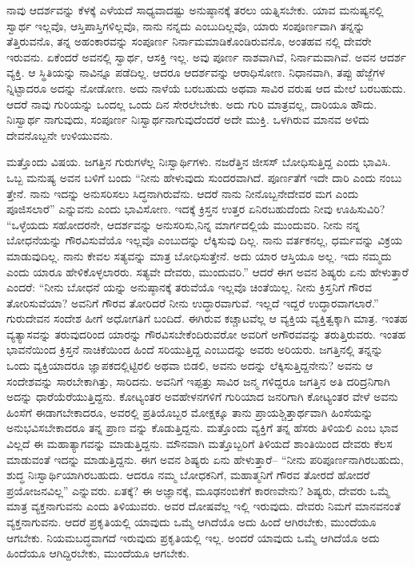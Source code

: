 ನಾವು ಆದರ್ಶವನ್ನು ಕೆಳಕ್ಕೆ ಎಳೆಯದೆ ಸಾಧ್ಯವಾದಷ್ಟು ಅನುಷ್ಠಾನಕ್ಕೆ ತರಲು ಯತ್ನಿಸಬೇಕು. ಯಾವ ಮನುಷ್ಯನಲ್ಲಿ ಸ್ವಾರ್ಥ ಇಲ್ಲವೊ, ಆಸ್ತಿಪಾಸ್ತಿಗಳಿಲ್ಲವೊ, ನಾನು ನನ್ನದು ಎಂಬುದಿಲ್ಲವೊ, ಯಾರು ಸಂಪೂರ್ಣವಾಗಿ ತನ್ನನ್ನು ತೆತ್ತಿರುವನೊ, ತನ್ನ ಅಹಂಕಾರವನ್ನು ಸಂಪೂರ್ಣ ನಿರ್ನಾಮಮಾಡಿಕೊಂಡಿರುವನೊ, ಅಂತಹವ ನಲ್ಲಿ ದೇವರೇ ಇರುವನು. ಏಕೆಂದರೆ ಅವನಲ್ಲಿ ಸ್ವಾರ್ಥ, ಆಸಕ್ತಿ ಇಲ್ಲ. ಅವು ಪೂರ್ಣ ನಾಶವಾಗಿವೆ, ನಿರ್ನಾಮ\-ವಾಗಿವೆ. ಅವನ ಆದರ್ಶ ವ್ಯಕ್ತಿ. ಆ ಸ್ಥಿತಿಯನ್ನು ನಾವಿನ್ನೂ ಪಡೆದಿಲ್ಲ. ಆದರೂ ಆದರ್ಶವನ್ನು ಆರಾಧಿಸೋಣ. ನಿಧಾನವಾಗಿ, ತಪ್ಪು ಹೆಜ್ಜೆಗಳ ನ್ನಿಟ್ಟಾದರೂ ಅದನ್ನು ನೋಡೋಣ. ಅದು ನಾಳೆಯೆ ಬರಬಹುದು ಅಥವಾ ಸಾವಿರ ವರುಷ ಆದ ಮೇಲೆ ಬರಬಹುದು. ಆದರೆ ನಾವು ಗುರಿಯನ್ನು ಒಂದಲ್ಲ ಒಂದು ದಿನ ಸೇರಲೇಬೇಕು. ಅದು ಗುರಿ ಮಾತ್ರವಲ್ಲ, ದಾರಿಯೂ ಹೌದು. ನಿಃಸ್ವಾರ್ಥ ನಾಗುವುದು, ಸಂಪೂರ್ಣ ನಿಃಸ್ವಾರ್ಥನಾಗುವುದೆಂದರೆ ಅದೇ ಮುಕ್ತಿ. ಒಳಗಿರುವ ಮಾನವ ಅಳಿದು ದೇವನೊಬ್ಬನೇ ಉಳಿಯುವನು.

ಮತ್ತೊಂದು ವಿಷಯ. ಜಗತ್ತಿನ ಗುರುಗಳೆಲ್ಲ ನಿಃಸ್ವಾರ್ಥಿಗಳು. ನಜರೆತ್ತಿನ ಜೀಸಸ್​ ಬೋಧಿಸುತ್ತಿದ್ದ ಎಂದು ಭಾವಿಸಿ. ಒಬ್ಬ ಮನುಷ್ಯ ಅವನ ಬಳಿಗೆ ಬಂದು “ನೀನು ಹೇಳುವುದು ಸುಂದರವಾಗಿದೆ. ಪೂರ್ಣತೆಗೆ ಇದೇ ದಾರಿ ಎಂದು ನಂಬು ತ್ತೇನೆ. ನಾನು ಇದನ್ನು ಅನುಸರಿಸಲು ಸಿದ್ಧನಾಗಿರುವೆನು. ಆದರೆ ನಾನು ನೀನೊಬ್ಬನೇದೇವರ ಮಗ ಎಂದು ಪೂಜಿಸಲಾರೆ” ಎನ್ನುವನು ಎಂದು ಭಾವಿಸೋಣ. ಇದಕ್ಕೆ ಕ್ರಿಸ್ತನ ಉತ್ತರ ಏನಿರಬಹುದೆಂದು ನೀವು ಊಹಿಸುವಿರಿ? “ಒಳ್ಳೆಯದು ಸಹೋದರನೇ, ಆದರ್ಶವನ್ನು ಅನುಸರಿಸು,\break ನಿನ್ನ ಮಾರ್ಗದಲ್ಲಿಯೆ ಮುಂದುವರಿ. ನೀನು ನನ್ನ ಬೋಧನೆಯನ್ನು ಗೌರವಿಸುವೆಯೊ ಇಲ್ಲವೊ ಎಂಬುದನ್ನು ಲೆಕ್ಕಿಸುವು ದಿಲ್ಲ. ನಾನು ವರ್ತಕನಲ್ಲ, ಧರ್ಮವನ್ನು ವಿಕ್ರಯ ಮಾಡುವುದಿಲ್ಲ. ನಾನು ಕೇವಲ ಸತ್ಯವನ್ನು ಮಾತ್ರ ಬೋಧಿಸುತ್ತೇನೆ. ಅದು ಯಾರ ಆಸ್ತಿಯೂ ಅಲ್ಲ. ಇದು ನಮ್ಮದು ಎಂದು ಯಾರೂ ಹೇಳಿಕೊಳ್ಳಲಾರರು. ಸತ್ಯವೇ ದೇವರು, ಮುಂದುವರಿ.” ಆದರೆ ಈಗ ಅವನ ಶಿಷ್ಯರು ಏನು ಹೇಳುತ್ತಾರೆ ಎಂದರೆ: “ನೀನು ಬೋಧನೆ ಯನ್ನು ಅನುಷ್ಠಾನಕ್ಕೆ ತರುವೆಯೊ ಇಲ್ಲವೊ ಚಿಂತೆಯಿಲ್ಲ. ನೀನು ಕ್ರಿಸ್ತನಿಗೆ ಗೌರವ ತೋರಿಸುವೆಯಾ? ಅವನಿಗೆ ಗೌರವ ತೋರಿದರೆ ನೀನು ಉದ್ಧಾರವಾಗುವೆ. ಇಲ್ಲದೆ ಇದ್ದರೆ ಉದ್ಧಾರವಾಗಲಾರೆ.” ಗುರುದೇವನ ಸಂದೇಶ ಹೀಗೆ ಅಧೋಗತಿಗೆ ಬಂದಿದೆ. ಈಗಿರುವ ಕಚ್ಚಾಟವೆಲ್ಲ ಆ ವ್ಯಕ್ತಿಯ ವ್ಯಕ್ತಿತ್ವಕ್ಕಾಗಿ ಮಾತ್ರ. ಇಂತಹ ವ್ಯತ್ಯಾಸವನ್ನು ತರುವುದರಿಂದ ಯಾರನ್ನು ಗೌರವಿಸಬೇಕೆಂದಿರುವರೋ ಅವರಿಗೆ ಅಗೌರವವನ್ನು ತರುತ್ತಿರುವರು. ಇಂತಹ ಭಾವನೆಯಿಂದ ಕ್ರಿಸ್ತನೆ ನಾಚಿಕೆಯಿಂದ ಹಿಂದೆ ಸರಿಯುತ್ತಿದ್ದ ಎಂಬುದನ್ನು ಅವರು ಅರಿಯರು. ಜಗತ್ತಿನಲ್ಲಿ ತನ್ನನ್ನು ಒಂದು ವ್ಯಕ್ತಿಯಾದರೂ ಜ್ಞಾಪಕದಲ್ಲಿಟ್ಟಿರಲಿ ಅಥವಾ ಬಿಡಲಿ, ಅವನು ಅದನ್ನು ಲೆಕ್ಕಿಸುತ್ತಿದ್ದನೇನು? ಅವನು ಆ ಸಂದೇಶವನ್ನು ಸಾರಬೇಕಾಗಿತ್ತು, ಸಾರಿದನು. ಅವನಿಗೆ ಇಪ್ಪತ್ತು ಸಾವಿರ ಜನ್ಮ ಗಳಿದ್ದರೂ ಜಗತ್ತಿನ ಅತಿ ದರಿದ್ರನಿಗಾಗಿ ಅದನ್ನು ಧಾರೆಯೆರೆಯುತ್ತಿದ್ದನು. ಕೋಟ್ಯಂತರ ಅವಹೇಳನಗಳಿಗೆ ಗುರಿಯಾದ ಜನರಿಗಾಗಿ ಕೋಟ್ಯಂತರ ವೇಳೆ ಅವನು ಹಿಂಸೆಗೆ ಈಡಾಗಬೇಕಾದರೂ, ಅವರಲ್ಲಿ ಪ್ರತಿಯೊಬ್ಬರ ಮೋಕ್ಷಕ್ಕೂ ತಾನು ಪ್ರಾಯಶ್ಚಿತ್ತಾರ್ಥವಾಗಿ ಹಿಂಸೆಯನ್ನು ಅನುಭವಿಸಬೇಕಾದರೂ ತನ್ನ ಪ್ರಾಣ ವನ್ನು ಕೊಡುತ್ತಿದ್ದನು. ಮತ್ತೊಂದು ವ್ಯಕ್ತಿಗೆ ತನ್ನ ಹೆಸರು ತಿಳಿಯಲಿ ಎಂಬ ಭಾವ ವಿಲ್ಲದೆ ಈ ಮಹಾತ್ಯಾಗವನ್ನು ಮಾಡುತ್ತಿದ್ದನು. ಮೌನವಾಗಿ ಮತ್ತೊಬ್ಬರಿಗೆ ತಿಳಿಯದೆ ಶಾಂತಿಯಿಂದ ದೇವರು ಕೆಲಸ ಮಾಡುವಂತೆ ಇದನ್ನು ಮಾಡುತ್ತಿದ್ದನು. ಈಗ ಅವನ ಶಿಷ್ಯರು ಏನು ಹೇಳುತ್ತಾರೆ– “ನೀನು ಪರಿಪೂರ್ಣನಾಗಿರಬಹುದು, ಶುದ್ಧ ನಿಃಸ್ವಾರ್ಥಿಯಾಗಿರಬಹುದು. ಆದರೂ ನಮ್ಮ ಬೋಧಕನಿಗೆ, ಮಹಾತ್ಮನಿಗೆ ಗೌರವ ತೋರದೆ ಹೋದರೆ ಪ್ರಯೋಜನವಿಲ್ಲ” ಎನ್ನುವರು. ಏತಕ್ಕೆ? ಈ ಅಜ್ಞಾನಕ್ಕೆ, ಮೂಢನಂಬಿಕೆಗೆ ಕಾರಣವೇನು? ಶಿಷ್ಯರು, ದೇವರು ಒಮ್ಮೆ ಮಾತ್ರ ವ್ಯಕ್ತನಾಗುವನು ಎಂದು ತಿಳಿಯುವರು. ಅವರ ದೋಷವೆಲ್ಲ ಇಲ್ಲಿ ಇರುವುದು. ದೇವರು ನಿಮಗೆ ಮಾನವನಂತೆ ವ್ಯಕ್ತನಾಗುವನು. ಆದರೆ ಪ್ರಕೃತಿಯಲ್ಲಿ ಯಾವುದು ಒಮ್ಮೆ ಆಗಿದೆಯೊ ಅದು ಹಿಂದೆ ಆಗಿರಬೇಕು, ಮುಂದೆಯೂ ಆಗಬೇಕು. ನಿಯಮಬದ್ಧವಾಗದೆ ಇರುವುದು ಪ್ರಕೃತಿಯಲ್ಲಿ ಇಲ್ಲ. ಅಂದರೆ ಯಾವುದು ಒಮ್ಮೆ ಆಗಿದೆಯೊ ಅದು ಹಿಂದೆಯೂ ಆಗಿದ್ದಿರಬೇಕು, ಮುಂದೆಯೂ ಆಗಬೇಕು.

